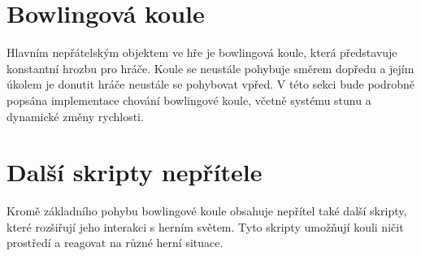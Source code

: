\newpage





\newpage

\newpage


\newpage
\section{Bowlingová koule}

Hlavním nepřátelským objektem ve hře je bowlingová koule, která představuje konstantní hrozbu pro hráče. Koule se neustále pohybuje směrem dopředu a jejím úkolem je donutit hráče neustále se pohybovat vpřed. V této sekci bude podrobně popsána implementace chování bowlingové koule, včetně systému stunu a dynamické změny rychlosti.



\newpage






\newpage
\section{Další skripty nepřítele}

Kromě základního pohybu bowlingové koule obsahuje nepřítel také další skripty, které rozšiřují jeho interakci s herním světem. Tyto skripty umožňují kouli ničit prostředí a reagovat na různé herní situace.



\newpage



